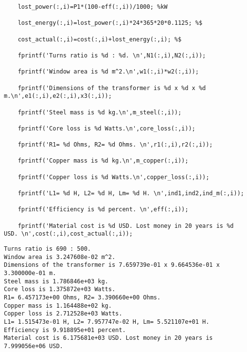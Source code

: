 \begin{verbatim}
    lost_power(:,i)=P1*(100-eff(:,i))/1000; %kW

    lost_energy(:,i)=lost_power(:,i)*24*365*20*0.1125; %$

    cost_actual(:,i)=cost(:,i)+lost_energy(:,i); %$

    fprintf('Turns ratio is %d : %d. \n',N1(:,i),N2(:,i));

    fprintf('Window area is %d m^2.\n',w1(:,i)*w2(:,i));

    fprintf('Dimensions of the transformer is %d x %d x %d m.\n',e1(:,i),e2(:,i),x3(:,i));

    fprintf('Steel mass is %d kg.\n',m_steel(:,i));

    fprintf('Core loss is %d Watts.\n',core_loss(:,i));

    fprintf('R1= %d Ohms, R2= %d Ohms. \n',r1(:,i),r2(:,i));

    fprintf('Copper mass is %d kg.\n',m_copper(:,i));

    fprintf('Copper loss is %d Watts.\n',copper_loss(:,i));

    fprintf('L1= %d H, L2= %d H, Lm= %d H. \n',ind1,ind2,ind_m(:,i));

    fprintf('Efficiency is %d percent. \n',eff(:,i));

    fprintf('Material cost is %d USD. Lost money in 20 years is %d USD. \n',cost(:,i),cost_actual(:,i));
\end{verbatim}

        \color{lightgray} \begin{verbatim}Turns ratio is 690 : 500. 
Window area is 3.247608e-02 m^2.
Dimensions of the transformer is 7.659739e-01 x 9.664536e-01 x 3.300000e-01 m.
Steel mass is 1.786846e+03 kg.
Core loss is 1.375872e+03 Watts.
R1= 6.457173e+00 Ohms, R2= 3.390660e+00 Ohms. 
Copper mass is 1.164488e+02 kg.
Copper loss is 2.712528e+03 Watts.
L1= 1.515473e-01 H, L2= 7.957747e-02 H, Lm= 5.521107e+01 H. 
Efficiency is 9.918895e+01 percent. 
Material cost is 6.175681e+03 USD. Lost money in 20 years is 7.999056e+06 USD. 
\end{verbatim} \color{black}
    
  
